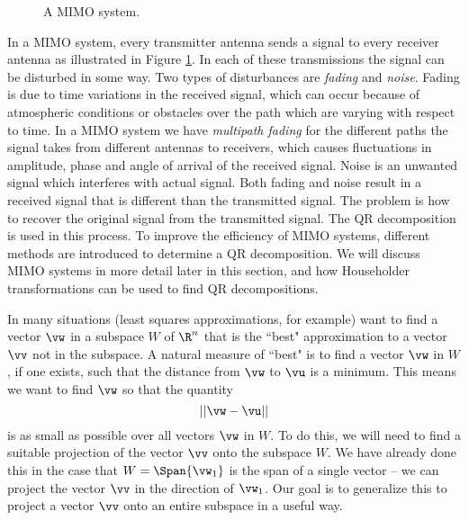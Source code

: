\begin{figure}[ht]
\begin{center}
\caption{A MIMO system.}
\label{F:MIMO}
\end{center}
\end{figure}
In a MIMO system, every transmitter antenna sends a signal to every receiver antenna as illustrated in Figure \ref{F:MIMO}. In each of these transmissions the signal can be disturbed in some way. Two types of disturbances are \emph{fading} and \emph{noise}. Fading is due to time variations in the received signal, which can occur because of atmospheric conditions or obstacles over the path which are varying with respect to time. In a MIMO system we have \emph{multipath fading} for the different paths the signal takes from different antennas to receivers, which causes fluctuations in amplitude, phase and angle of arrival of the received signal. Noise is an unwanted signal which interferes with actual signal. Both fading and noise result in a received signal that is different than the transmitted signal. The problem is how to recover the original signal from the transmitted signal. The QR decomposition is used in this process. To improve the efficiency of MIMO systems, different methods are introduced to determine a QR decomposition. We will discuss MIMO systems in more detail later in this section, and how Householder transformations can be used to find QR decompositions. 

\label{sec:gram_schmidt_intro}

In many situations (least squares approximations, for example) want to find a vector $\vw$ in a subspace $W$ of $\R^n$ that is the ``best" approximation to a vector $\vv$ not in the subspace. A natural measure of ``best" is to find a vector $\vw$ in $W$, if one exists, such that the distance from $\vw$ to $\vu$ is a minimum. This means we want to find $\vw$ so that the quantity
\[||\vw - \vu ||\]
is as small as possible over all vectors $\vw$ in $W$. To do this, we will need to find a suitable projection of the vector $\vv$ onto the subspace $W$. We have already done this in the case that $W = \Span\{\vw_1\}$  is the span of a single vector -- we can project the vector $\vv$ in the direction of $\vw_1$. Our goal is to generalize this to project a vector $\vv$ onto an entire subspace in a useful way. 

